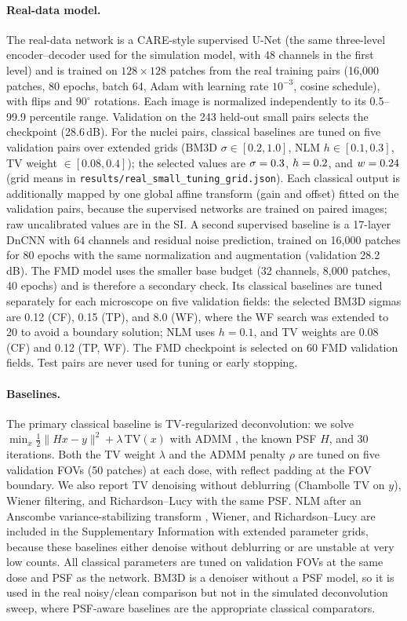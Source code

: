 \documentclass[preprint,12pt]{elsarticle}
\begin{document}
\paragraph{Real-data model.}
The real-data network is a CARE-style supervised U-Net (the same three-level
encoder--decoder used for the simulation model, with 48 channels in the first
level) and is trained on $128\times128$ patches from the real training pairs
(16{,}000 patches, 80 epochs, batch 64, Adam with learning rate $10^{-3}$,
cosine schedule), with flips and $90^\circ$ rotations. Each image is normalized
independently to its 0.5--99.9 percentile range. Validation on the 243 held-out
small pairs selects the checkpoint (28.6\,dB). For the nuclei pairs, classical baselines are tuned
on five validation pairs over extended grids (BM3D \cite{dabov2007}
$\sigma\in[0.2,1.0]$, NLM
$h\in[0.1,0.3]$, TV weight $\in[0.08,0.4]$); the selected values are
$\sigma=0.3$, $h=0.2$, and $w=0.24$ (grid means in
\texttt{results/real\_small\_tuning\_grid.json}). Each classical output is
additionally mapped by one global affine transform (gain and offset) fitted on
the validation pairs, because the supervised networks are trained on paired
images; raw uncalibrated values are in the SI. A second supervised baseline
is a 17-layer DnCNN \cite{zhang2017dncnn} with 64 channels and residual noise
prediction, trained on 16{,}000 patches for 80 epochs with the same
normalization and augmentation (validation 28.2\,dB). The FMD model uses the smaller base budget (32
channels, 8{,}000 patches, 40 epochs) and is therefore a secondary check.
Its classical baselines are tuned separately for each microscope on five
validation fields: the selected BM3D sigmas are 0.12 (CF), 0.15 (TP), and 8.0
(WF), where the WF search was extended to 20 to avoid a boundary solution; NLM
uses $h=0.1$, and TV weights are 0.08 (CF) and 0.12 (TP, WF). The FMD
checkpoint is selected on 60 FMD validation fields. Test pairs are never used
for tuning or early stopping.

\paragraph{Baselines.}
The primary classical baseline is TV-regularized deconvolution: we solve
$\min_x \tfrac12\|Hx-y\|^2+\lambda\,\mathrm{TV}(x)$ with ADMM
\cite{boyd2011}, the known PSF $H$, and 30 iterations. Both the TV weight
$\lambda$ and the ADMM penalty $\rho$ are tuned on five validation FOVs
(50 patches) at each dose, with reflect padding at the FOV boundary. We
also report TV denoising without deblurring (Chambolle TV on $y$), Wiener
filtering, and Richardson--Lucy with the same PSF. NLM after an Anscombe
variance-stabilizing transform \cite{anscombe1948,makitalo2011}, Wiener, and
Richardson--Lucy are included in the
Supplementary Information with extended parameter grids, because these
baselines either denoise without deblurring or are unstable at very low counts.
All classical parameters are tuned on validation FOVs at the same dose and PSF
as the network. BM3D is a denoiser without a PSF model, so it is used in the
real noisy/clean comparison but not in the simulated deconvolution sweep, where
PSF-aware baselines are the appropriate classical comparators.
\end{document}
